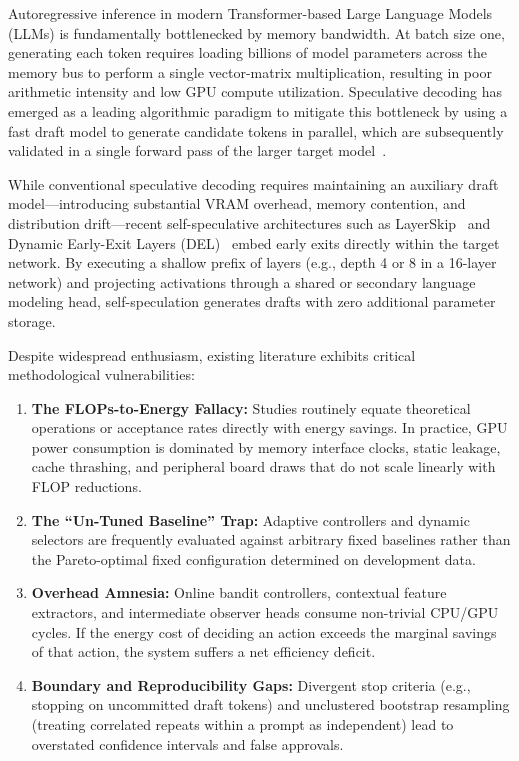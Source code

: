 \documentclass[10pt,twocolumn,letterpaper]{article}
\begin{document}
Autoregressive inference in modern Transformer-based Large Language Models (LLMs) is fundamentally bottlenecked by memory bandwidth. At batch size one, generating each token requires loading billions of model parameters across the memory bus to perform a single vector-matrix multiplication, resulting in poor arithmetic intensity and low GPU compute utilization. Speculative decoding has emerged as a leading algorithmic paradigm to mitigate this bottleneck by using a fast draft model to generate candidate tokens in parallel, which are subsequently validated in a single forward pass of the larger target model~\cite{leviathan2023fast,chen2023accelerating}.

While conventional speculative decoding requires maintaining an auxiliary draft model---introducing substantial VRAM overhead, memory contention, and distribution drift---recent self-speculative architectures such as LayerSkip~\cite{elhoushi2024layerskip} and Dynamic Early-Exit Layers (DEL)~\cite{zhang2025del} embed early exits directly within the target network. By executing a shallow prefix of layers (e.g., depth 4 or 8 in a 16-layer network) and projecting activations through a shared or secondary language modeling head, self-speculation generates drafts with zero additional parameter storage.

Despite widespread enthusiasm, existing literature exhibits critical methodological vulnerabilities:
\begin{enumerate}
    \item \textbf{The FLOPs-to-Energy Fallacy:} Studies routinely equate theoretical operations or acceptance rates directly with energy savings. In practice, GPU power consumption is dominated by memory interface clocks, static leakage, cache thrashing, and peripheral board draws that do not scale linearly with FLOP reductions.
    \item \textbf{The ``Un-Tuned Baseline'' Trap:} Adaptive controllers and dynamic selectors are frequently evaluated against arbitrary fixed baselines rather than the Pareto-optimal fixed configuration determined on development data.
    \item \textbf{Overhead Amnesia:} Online bandit controllers, contextual feature extractors, and intermediate observer heads consume non-trivial CPU/GPU cycles. If the energy cost of deciding an action exceeds the marginal savings of that action, the system suffers a net efficiency deficit.
    \item \textbf{Boundary and Reproducibility Gaps:} Divergent stop criteria (e.g., stopping on uncommitted draft tokens) and unclustered bootstrap resampling (treating correlated repeats within a prompt as independent) lead to overstated confidence intervals and false approvals.
\end{enumerate}
\end{document}
